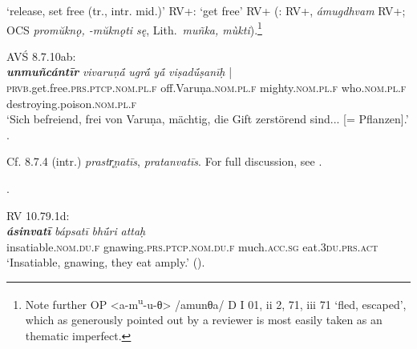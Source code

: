 \documentclass[output=paper,colorlinks,citecolor=brown]{langscibook}
\begin{document}
\begin{exe}
\begin{xlist}
\ex  {} ‘release, set free (tr., intr. mid.)’ RV+:  ‘get free’ RV+ (:  RV+, {\textit{ámugdhvam}} RV+; OCS \textit{promŭknǫ, -mŭknǫti sę}, Lith.\ \textit{muñka, mùkti}).\footnote{Note further OP <a-m\textsuperscript{u}{}-u-θ> /amunθa/  D I 01, ii 2, 71, iii 71 ‘fled, escaped', which as generously pointed out by a reviewer is most easily taken as an  thematic imperfect.}\\\smallskip

AVŚ 8.7.10ab:\\ \gll 
{\textbf{\textit{unmuñcántīr}} } \textit{vivaruṇ{ā́}} \textit{ugr{ā́}} \textit{y{ā́}} {\textit{viṣadū́ṣanīḥ} |}\\
\textsc{prvb}.get.free.\textsc{prs.ptcp.nom.pl.f} off.Varuṇa.\textsc{nom.pl.f} mighty.\textsc{nom.pl.f} who.\textsc{nom.pl.f} destroying.poison.\textsc{nom.pl.f}\\
\glt  `Sich befreiend, frei von Varuṇa, mächtig, die Gift zerstörend sind... [= Pflanzen].' \citep[214]{Zasada2021}.\\\smallskip
 
 {  Cf. 8.7.4 (intr.)  \textit{prastr̥ṇatīs},   \textit{pratanvatīs}. For full discussion, see \citealt[214]{Zasada2021}.}
 
.\\\smallskip

RV 10.79.1d:\\ \gll 
{\textbf{\textit{ásinvatī}} } \textit{bápsatī} \textit{bhū́ri} \textit{attaḥ}\\
insatiable.\textsc{nom.du.f} gnawing.\textsc{prs.ptcp.nom.du.f} much.\textsc{acc.sg} eat.\textsc{3du.prs.act}\\
\glt `Insatiable, gnawing, they eat amply.' (\citealt{JamisonBrereton2014}).
\end{xlist}
\end{exe}
\end{document}

